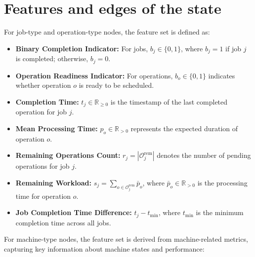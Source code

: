 \section{Features and edges of the state}
\label{app:features}

For job-type and operation-type nodes, the feature set is defined as:

\begin{itemize}
    \item \textbf{Binary Completion Indicator:} For jobs, $b_j \in \{0, 1\}$, where $b_j = 1$ if job $j$ is completed; otherwise, $b_j = 0$.
    \item \textbf{Operation Readiness Indicator:} For operations, $b_o \in \{0, 1\}$ indicates whether operation $o$ is ready to be scheduled.
    \item \textbf{Completion Time:} $t_j \in \mathbb{R}_{\geq 0}$ is the timestamp of the last completed operation for job $j$.
    \item \textbf{Mean Processing Time:} $p_o \in \mathbb{R}_{> 0}$ represents the expected duration of operation $o$.
    \item \textbf{Remaining Operations Count:} $r_j = |\mathcal{O}_j^{\text{rem}}|$ denotes the number of pending operations for job $j$.
    \item \textbf{Remaining Workload:} $s_j = \sum_{o \in \mathcal{O}_j^{\text{rem}}} \bar{p}_o$, where $\bar{p}_o \in \mathbb{R}_{> 0}$ is the processing time for operation $o$.
    \item \textbf{Job Completion Time Difference:} $t_j - t_{\text{min}}$, where $t_{\text{min}}$ is the minimum completion time across all jobs.
\end{itemize}

For machine-type nodes, the feature set is derived from machine-related metrics, capturing key information about machine states and performance:

